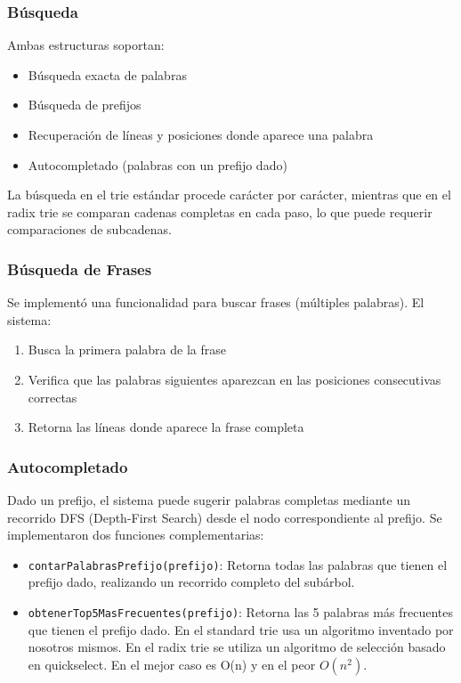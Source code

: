 \documentclass[11pt,a4paper]{article}
\begin{document}
\subsubsection{Búsqueda}

Ambas estructuras soportan:
\begin{itemize}
    \item Búsqueda exacta de palabras
    \item Búsqueda de prefijos 
    \item Recuperación de líneas y posiciones donde aparece una palabra
    \item Autocompletado (palabras con un prefijo dado)
\end{itemize}

La búsqueda en el trie estándar procede carácter por carácter, mientras que en el radix trie se comparan cadenas completas en cada paso, lo que puede requerir comparaciones de subcadenas.

\subsubsection{Búsqueda de Frases}

Se implementó una funcionalidad para buscar frases (múltiples palabras). El sistema:
\begin{enumerate}
    \item Busca la primera palabra de la frase
    \item Verifica que las palabras siguientes aparezcan en las posiciones consecutivas correctas
    \item Retorna las líneas donde aparece la frase completa
\end{enumerate}

\subsubsection{Autocompletado}

Dado un prefijo, el sistema puede sugerir palabras completas mediante un recorrido DFS (Depth-First Search) desde el nodo correspondiente al prefijo. Se implementaron dos funciones complementarias:

\begin{itemize}
    \item \texttt{contarPalabrasPrefijo(prefijo)}: Retorna todas las palabras que tienen el prefijo dado, realizando un recorrido completo del subárbol.
    
    \item \texttt{obtenerTop5MasFrecuentes(prefijo)}: Retorna las 5 palabras más frecuentes que tienen el prefijo dado. En el standard trie usa un algoritmo inventado por nosotros mismos. En el radix trie se utiliza un algoritmo de selección basado en quickselect. En el mejor caso es O(n) y en el peor $O(n^2)$.
\end{itemize}
\end{document}
